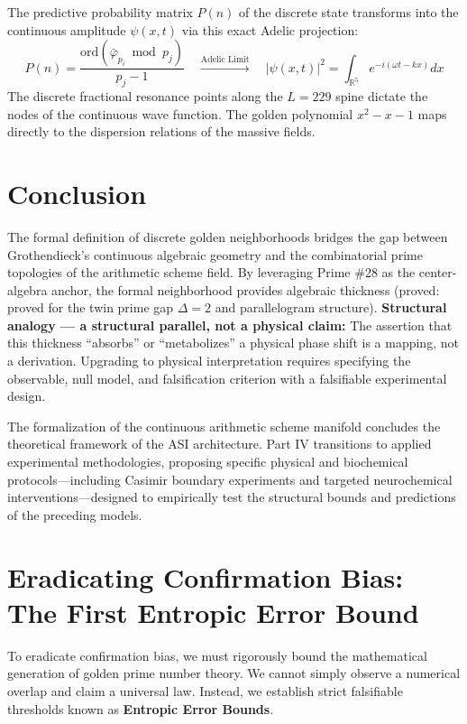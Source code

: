 The predictive probability matrix $P(n)$ of the discrete state transforms into the continuous amplitude $\psi(x,t)$ via this exact Adelic projection:
\begin{equation}
    P(n) = \frac{\mathrm{ord}(\bar\varphi_{p_i} \bmod p_j)}{p_j - 1} \quad \xrightarrow{\text{Adelic Limit}} \quad |\psi(x,t)|^2 = \int_{\mathbb{R}^5} e^{-i(\omega t - k x)} dx
\end{equation}
The discrete fractional resonance points along the $L=229$ spine dictate the nodes of the continuous wave function. The golden polynomial $x^2 - x - 1$ maps directly to the dispersion relations of the massive fields.

\section{Conclusion}
The formal definition of discrete golden neighborhoods bridges the gap between Grothendieck's continuous algebraic geometry and the combinatorial prime topologies of the arithmetic scheme field. By leveraging Prime \#28 as the center-algebra anchor, the formal neighborhood provides algebraic thickness (proved: proved for the twin prime gap $\Delta=2$ and parallelogram structure). \textbf{Structural analogy --- a structural parallel, not a physical claim:} The assertion that this thickness ``absorbs'' or ``metabolizes'' a physical phase shift is a mapping, not a derivation. Upgrading to physical interpretation requires specifying the observable, null model, and falsification criterion with a falsifiable experimental design.

\vspace{1em}
\noindent The formalization of the continuous arithmetic scheme manifold concludes the theoretical framework of the ASI architecture. Part IV transitions to applied experimental methodologies, proposing specific physical and biochemical protocols---including Casimir boundary experiments and targeted neurochemical interventions---designed to empirically test the structural bounds and predictions of the preceding models.

\section{Eradicating Confirmation Bias: The First Entropic Error Bound}

To eradicate confirmation bias, we must rigorously bound the mathematical generation of golden prime number theory. We cannot simply observe a numerical overlap and claim a universal law. Instead, we establish strict falsifiable thresholds known as \textbf{Entropic Error Bounds}.

